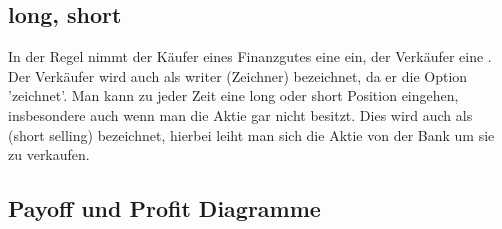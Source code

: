 
\subsection{long, short} %
\label{sub: long,_short}

In der Regel nimmt der Käufer eines Finanzgutes eine  ein, der Verkäufer eine .
Der Verkäufer wird auch als writer (Zeichner) bezeichnet, da er die Option 'zeichnet'. Man kann zu jeder Zeit eine long oder short Position eingehen, insbesondere auch wenn man die Aktie gar nicht besitzt. Dies wird auch als  (short selling) bezeichnet, hierbei leiht man sich die Aktie von der Bank um sie zu verkaufen.

\vfill


\subsection{Payoff und Profit Diagramme} %
\label{sub:payoff_und_profit_diagramme}

